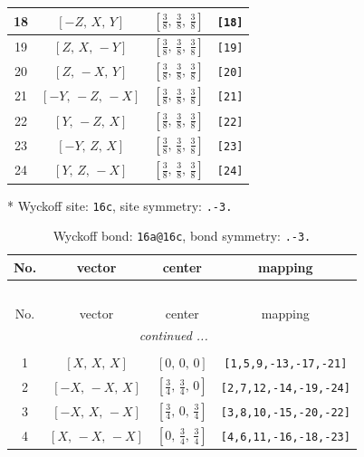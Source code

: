 \documentclass[fleqn,8pt]{jsarticle}
\begin{document}
\begin{longtable}{cccc}
18 & $\left[ - Z,\, X,\, Y \right]$ & $\left[ \frac{3}{8},\, \frac{3}{8},\, \frac{3}{8} \right]$ & {\tt [18]} \\ \hline
19 & $\left[ Z,\, X,\, - Y \right]$ & $\left[ \frac{3}{8},\, \frac{3}{8},\, \frac{3}{8} \right]$ & {\tt [19]} \\ \hline
20 & $\left[ Z,\, - X,\, Y \right]$ & $\left[ \frac{3}{8},\, \frac{3}{8},\, \frac{3}{8} \right]$ & {\tt [20]} \\ \hline
21 & $\left[ - Y,\, - Z,\, - X \right]$ & $\left[ \frac{3}{8},\, \frac{3}{8},\, \frac{3}{8} \right]$ & {\tt [21]} \\ \hline
22 & $\left[ Y,\, - Z,\, X \right]$ & $\left[ \frac{3}{8},\, \frac{3}{8},\, \frac{3}{8} \right]$ & {\tt [22]} \\ \hline
23 & $\left[ - Y,\, Z,\, X \right]$ & $\left[ \frac{3}{8},\, \frac{3}{8},\, \frac{3}{8} \right]$ & {\tt [23]} \\ \hline
24 & $\left[ Y,\, Z,\, - X \right]$ & $\left[ \frac{3}{8},\, \frac{3}{8},\, \frac{3}{8} \right]$ & {\tt [24]} \\
\end{longtable}
* Wyckoff site: {\tt 16c}, site symmetry: {\tt .-3.}
\renewcommand{\arraystretch}{1.2}
\begin{longtable}{cccc}
\caption{Wyckoff bond: {\tt 16a@16c}, bond symmetry: {\tt .-3.}}
 \\
 \hline \hline
No. & vector & center & mapping \\ \hline \endfirsthead

\multicolumn{3}{l}{\tablename\ \thetable{}} \\
 \hline \hline
No. & vector & center & mapping \\ \hline \endhead

 \hline \hline
\multicolumn{3}{r}{\footnotesize\it continued ...} \\ \endfoot

 \hline \hline
\multicolumn{3}{r}{} \\ \endlastfoot

1 & $\left[ X,\, X,\, X \right]$ & $\left[ 0,\, 0,\, 0 \right]$ & {\tt [1,5,9,-13,-17,-21]} \\ \hline
2 & $\left[ - X,\, - X,\, X \right]$ & $\left[ \frac{3}{4},\, \frac{3}{4},\, 0 \right]$ & {\tt [2,7,12,-14,-19,-24]} \\ \hline
3 & $\left[ - X,\, X,\, - X \right]$ & $\left[ \frac{3}{4},\, 0,\, \frac{3}{4} \right]$ & {\tt [3,8,10,-15,-20,-22]} \\ \hline
4 & $\left[ X,\, - X,\, - X \right]$ & $\left[ 0,\, \frac{3}{4},\, \frac{3}{4} \right]$ & {\tt [4,6,11,-16,-18,-23]} \\
\end{longtable}
\end{document}
